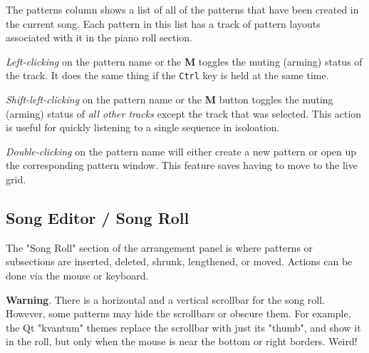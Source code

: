    The patterns column shows a list of all of the patterns that have been
   created in the current song.  Each pattern in this list has a track of
   pattern layouts associated with it in the piano roll section.

   \textsl{Left-clicking} on the pattern name or the \textbf{M} toggles the muting
   (arming) status of the track.
   It does the same thing if the \texttt{Ctrl} key is held at the same time.

   \textsl{Shift-left-clicking} on the pattern name
   or the \textbf{M} button toggles the muting
   (arming) status of \textsl{all other tracks} except the track that was
   selected.  This action is useful for quickly listening to a single sequence
   in isoloation.

   \textsl{Double-clicking} on the pattern name
   will either create a new pattern or open up the corresponding pattern
   window.
   This feature saves having to move to the live grid.

%

\subsection{Song Editor / Song Roll}
\label{subsec:song_editor_song_roll}

   The "Song Roll" section of the arrangement panel is where patterns or
   subsections are inserted, deleted, shrunk, lengthened, or moved.
   Actions can be done via the mouse or keyboard.

   \textbf{Warning}.
   There is a horizontal and a vertical scrollbar for the song roll.
   However, some patterns may hide the scrollbars or obscure them.
   For example, the Qt "kvantum" themes replace the scrollbar
   with just its "thumb", and show it in the roll, but only when the
   mouse is near the bottom or right borders.
   Weird!

